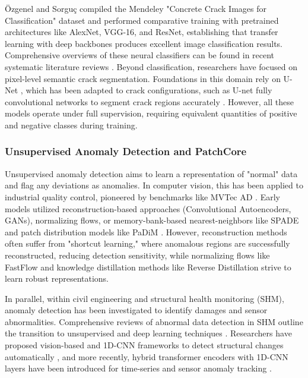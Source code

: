 \documentclass[runningheads]{llncs}
\begin{document}
Özgenel and Sorguç \cite{ozgenel2018performance} compiled the Mendeley "Concrete Crack Images for Classification" dataset and performed comparative training with pretrained architectures like AlexNet, VGG-16, and ResNet, establishing that transfer learning with deep backbones produces excellent image classification results. Comprehensive overviews of these neural classifiers can be found in recent systematic literature reviews \cite{Golding2022CrackDI,Mazni2024Identification}. Beyond classification, researchers have focused on pixel-level semantic crack segmentation. Foundations in this domain rely on U-Net \cite{ronneberger2015u}, which has been adapted to crack configurations, such as U-net fully convolutional networks to segment crack regions accurately \cite{liu2019computer}. However, all these models operate under full supervision, requiring equivalent quantities of positive and negative classes during training.

\subsubsection{Unsupervised Anomaly Detection and PatchCore}
Unsupervised anomaly detection aims to learn a representation of "normal" data and flag any deviations as anomalies. In computer vision, this has been applied to industrial quality control, pioneered by benchmarks like MVTec AD \cite{bergmann2021mvtec,bergmann2019mvtec}. Early models utilized reconstruction-based approaches (Convolutional Autoencoders, GANs), normalizing flows, or memory-bank-based nearest-neighbors like SPADE \cite{cohen2020sub} and patch distribution models like PaDiM \cite{defard2021padim}. However, reconstruction methods often suffer from "shortcut learning," where anomalous regions are successfully reconstructed, reducing detection sensitivity, while normalizing flows like FastFlow \cite{yu2021fastflow} and knowledge distillation methods like Reverse Distillation \cite{Deng_2022_CVPR} strive to learn robust representations. 

In parallel, within civil engineering and structural health monitoring (SHM), anomaly detection has been investigated to identify damages and sensor abnormalities. Comprehensive reviews of abnormal data detection in SHM outline the transition to unsupervised and deep learning techniques \cite{deng2024abnormal,sonbul2025bridge}. Researchers have proposed vision-based and 1D-CNN frameworks to detect structural changes automatically \cite{bao2019computer,kim2023data}, and more recently, hybrid transformer encoders with 1D-CNN layers have been introduced for time-series and sensor anomaly tracking \cite{nuriev2025data}.
\end{document}
